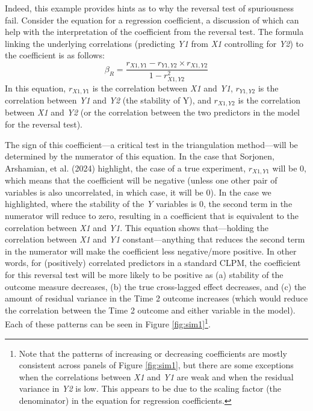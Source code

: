 \documentclass[
  man,mask,floatsintext]{apa6}
\begin{document}
Indeed, this example provides hints as to why the reversal test of spuriousness fail. Consider the equation for a regression coefficient, a discussion of which can help with the interpretation of the coefficient from the reversal test. The formula linking the underlying correlations (predicting \emph{Y1} from \emph{X1} controlling for \emph{Y2}) to the coefficient is as follows: \[\beta_{R} = \frac{r_{X1,Y1} - r_{Y1,Y2} \times r_{X1,Y2}} {1 - r_{X1,Y2}^{2}}\] In this equation, \(r_{X1,Y1}\) is the correlation between \emph{X1} and \emph{Y1}, \(r_{Y1,Y2}\) is the correlation between \emph{Y1} and \emph{Y2} (the stability of Y), and \(r_{X1,Y2}\) is the correlation between \emph{X1} and \emph{Y2} (or the correlation between the two predictors in the model for the reversal test).

The sign of this coefficient---a critical test in the triangulation method---will be determined by the numerator of this equation. In the case that Sorjonen, Arshamian, et al. (2024) highlight, the case of a true experiment, \(r_{X1,Y1}\) will be 0, which means that the coefficient will be negative (unless one other pair of variables is also uncorrelated, in which case, it will be 0). In the case we highlighted, where the stability of the \emph{Y} variables is 0, the second term in the numerator will reduce to zero, resulting in a coefficient that is equivalent to the correlation between \emph{X1} and \emph{Y1}. This equation shows that---holding the correlation between \emph{X1} and \emph{Y1} constant---anything that reduces the second term in the numerator will make the coefficient less negative/more positive. In other words, for (positively) correlated predictors in a standard CLPM, the coefficient for this reversal test will be more likely to be positive as (a) stability of the outcome measure decreases, (b) the true cross-lagged effect decreases, and (c) the amount of residual variance in the Time 2 outcome increases (which would reduce the correlation between the Time 2 outcome and either variable in the model). Each of these patterns can be seen in Figure \ref{fig:sim1}\footnote{Note that the patterns of increasing or decreasing coefficients are mostly consistent across panels of Figure \ref{fig:sim1}, but there are some exceptions when the correlations between \emph{X1} and \emph{Y1} are weak and when the residual variance in \emph{Y2} is low. This appears to be due to the scaling factor (the denominator) in the equation for regression coefficients.}.
\end{document}
